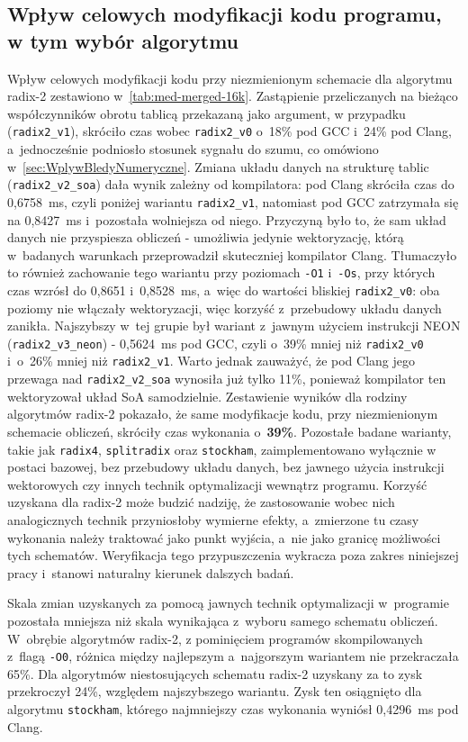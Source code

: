 \subsection{Wpływ celowych modyfikacji kodu programu, w tym wybór algorytmu}
Wpływ celowych modyfikacji kodu przy niezmienionym schemacie dla algorytmu radix-2 zestawiono
w~\cref{tab:med-merged-16k}. Zastąpienie przeliczanych na bieżąco współczynników
obrotu tablicą przekazaną jako argument, w przypadku (\texttt{radix2\_v1}), skróciło czas wobec
\texttt{radix2\_v0} o~18\% pod GCC i~24\% pod Clang, a~jednocześnie podniosło
stosunek sygnału do szumu, co omówiono w~\cref{sec:WplywBledyNumeryczne}. Zmiana
układu danych na strukturę tablic (\texttt{radix2\_v2\_soa}) dała wynik zależny
od kompilatora: pod Clang skróciła czas do 0,6758~ms, czyli poniżej wariantu
\texttt{radix2\_v1}, natomiast pod GCC zatrzymała się na 0,8427~ms i~pozostała
wolniejsza od niego. Przyczyną było to, że sam układ danych nie przyspiesza
obliczeń - umożliwia jedynie wektoryzację, którą w~badanych warunkach
przeprowadził skuteczniej kompilator Clang. Tłumaczyło to również
zachowanie tego wariantu przy poziomach \texttt{-O1} i~\texttt{-Os}, przy
których czas wzrósł do 0,8651 i~0,8528~ms, a~więc do wartości bliskiej
\texttt{radix2\_v0}: oba poziomy nie włączały wektoryzacji, więc korzyść
z~przebudowy układu danych zanikła. Najszybszy w~tej grupie był wariant
z~jawnym użyciem instrukcji NEON (\texttt{radix2\_v3\_neon}) - 0,5624~ms pod
GCC, czyli o~39\% mniej niż \texttt{radix2\_v0} i~o~26\% mniej niż
\texttt{radix2\_v1}. Warto jednak zauważyć, że pod Clang jego przewaga nad
\texttt{radix2\_v2\_soa} wynosiła już tylko 11\%, ponieważ kompilator ten
wektoryzował układ SoA samodzielnie.
Zestawienie wyników dla rodziny algorytmów radix-2 pokazało, że same modyfikacje kodu,
przy niezmienionym schemacie obliczeń, skróciły czas wykonania o~\textbf{39\%}.
Pozostałe badane warianty, takie jak \texttt{radix4},
\texttt{splitradix} oraz \texttt{stockham},  zaimplementowano wyłącznie
w postaci bazowej, bez przebudowy układu danych, bez jawnego użycia instrukcji
wektorowych czy innych technik optymalizacji wewnątrz programu.
Korzyść uzyskana dla radix-2 może budzić nadziję, że zastosowanie wobec nich analogicznych
technik przyniosłoby wymierne efekty, a~zmierzone tu czasy wykonania należy traktować
jako punkt wyjścia, a~nie jako granicę możliwości tych schematów. Weryfikacja
tego przypuszczenia wykracza poza zakres niniejszej pracy i~stanowi naturalny
kierunek dalszych badań.

Skala zmian uzyskanych za pomocą jawnych technik optymalizacji w~programie
pozostała mniejsza niż skala wynikająca z~wyboru samego
schematu obliczeń. W~obrębie algorytmów radix-2, z pominięciem programów skompilowanych z~flagą \texttt{-O0}, różnica między najlepszym a~najgorszym wariantem nie
przekraczała 65\%. Dla algorytmów niestosujących schematu radix-2 uzyskany za to zysk przekroczył 24\%, względem najszybszego wariantu. Zysk ten osiągnięto dla
algorytmu \texttt{stockham}, którego najmniejszy czas wykonania wyniósł 0,4296~ms pod Clang.


